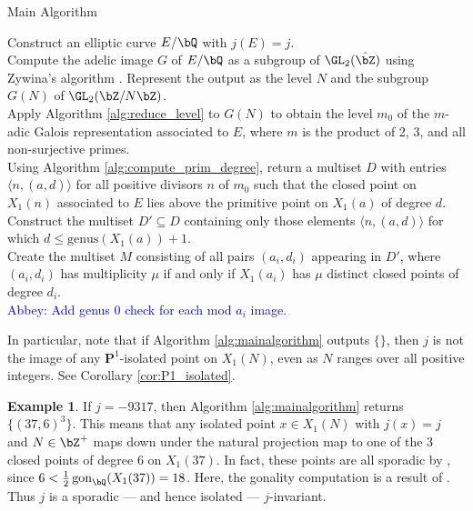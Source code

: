 \documentclass[11pt,reqno]{amsart}
\theoremstyle{plain}
\theoremstyle{definition}
\newtheorem{example}[theorem]{Example}
\DeclareMathOperator{\gon}{gon}
\newcommand{\Q}{\bQ}
\newcommand{\Z}{\bZ}
\newcommand{\abbey}[1]{\textcolor{blue}{Abbey: #1}}
\begin{document}
\setcounter{algocf}{0}
\begin{algorithm}[h!]
\caption{Main Algorithm}\label{alg:mainalgorithm}
\KwIn{A non-CM $j$-invariant $j \in \Q$.}
Construct an elliptic curve $E/\Q$ with $j(E)=j$.\\
Compute the adelic image $G$ of $E/\Q$ as a subgroup of $\GL_2(\hat{\Z})$ using Zywina's algorithm \cite{ZywinaAlgorithm}. Represent the output as the level $N$ and the subgroup $G(N)$ of $\GL_2(\Z/N\Z)$.\\
Apply Algorithm \ref{alg:reduce_level} to $G(N)$ to obtain the level $m_0$ of the $m$-adic Galois representation associated to $E$, where $m$ is the product of 2, 3, and all non-surjective primes.\\
Using Algorithm \ref{alg:compute_prim_degree}, return a multiset $D$ with entries $\langle n, (a, d) \rangle$
    for all positive divisors $n$ of $m_0$ such that the closed point on $X_1(n)$ associated to $E$ lies above the primitive point on $X_1(a) $
    of degree $d$.\\
Construct the multiset $D' \subseteq D$ containing only those elements $\langle n, (a, d)\rangle$ for which $d \leq \text{genus}(X_1(a))+1$.\\
Create the multiset $M$ consisting of all pairs $(a_i,d_i)$ appearing in $D'$, where $(a_i,d_i) $ has multiplicity $\mu$ if and only if $X_1(a_i)$ has $\mu$ distinct closed points of degree $d_i$.\\
\abbey{Add genus 0 check for each mod $a_i$ image.}\\
\Return{$[j,M]$}

\end{algorithm}

In particular, note that if Algorithm \ref{alg:mainalgorithm} outputs $\{\}$, then $j$ is not the image of any $\mathbf{P}^1$-isolated point on $X_1(N)$, even as $N$ ranges over all positive integers. See Corollary \ref{cor:P1_isolated}.

\begin{example}
If $j=-9317$, then Algorithm \ref{alg:mainalgorithm} returns $ \{(37,6) ^3\}$. This means that any isolated point $x\in X_1(N)$ with $j(x)=j$ and $N \in \Z^+$ maps down under the natural projection map to one of the 3 closed points of degree 6 on $X_1(37)$. In fact, these points are all sporadic by \cite[Proposition 2]{frey}, since $6 < \frac{1}{2} \gon_{\Q}(X_1(37)) = 18$. Here, the gonality computation is a result of \cite{DerickxVanHoeij2014}. Thus $j$ is a sporadic --- and hence isolated --- $j$-invariant.
\end{example}
\end{document}
